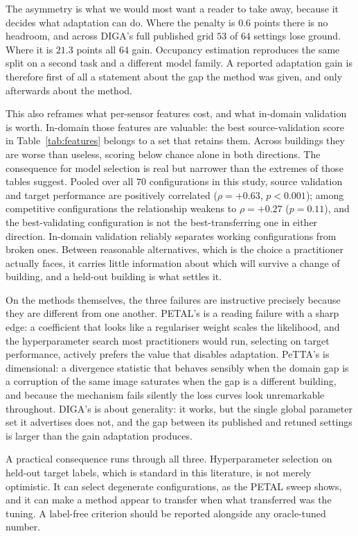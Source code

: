 \documentclass[a4paper,fleqn]{cas-dc}
\begin{document}
The asymmetry is what we would most want a reader to take away, because it decides what
adaptation can do. Where the penalty is $0.6$ points there is no headroom, and across
DIGA's full published grid $53$ of $64$ settings lose ground. Where it is $21.3$ points
all $64$ gain. Occupancy estimation reproduces the same split on a second task and a
different model family. A reported adaptation gain is therefore first of all a statement
about the gap the method was given, and only afterwards about the method.

This also reframes what per-sensor features cost, and what in-domain validation is worth.
In-domain those features are valuable: the best source-validation score in
Table~\ref{tab:features} belongs to a set that retains them. Across buildings they are
worse than useless, scoring below chance alone in both directions. The consequence for
model selection is real but narrower than the extremes of those tables suggest. Pooled
over all $70$ configurations in this study, source validation and target performance are
positively correlated ($\rho=+0.63$, $p<0.001$); among competitive configurations the
relationship weakens to $\rho=+0.27$ ($p=0.11$), and the best-validating configuration is
not the best-transferring one in either direction. In-domain validation reliably separates
working configurations from broken ones. Between reasonable alternatives, which is the
choice a practitioner actually faces, it carries little information about which will
survive a change of building, and a held-out building is what settles it.

On the methods themselves, the three failures are instructive precisely because they are
different from one another. PETAL's is a reading failure with a sharp edge: a coefficient
that looks like a regulariser weight scales the likelihood, and the hyperparameter search
most practitioners would run, selecting on target performance, actively prefers the
value that disables adaptation. PeTTA's is dimensional: a divergence statistic that behaves
sensibly when the domain gap is a corruption of the same image saturates when the gap is a
different building, and because the mechanism fails silently the loss curves look
unremarkable throughout. DIGA's is about generality: it works, but the single global
parameter set it advertises does not, and the gap between its published and retuned
settings is larger than the gain adaptation produces.

A practical consequence runs through all three. Hyperparameter selection on held-out target
labels, which is standard in this literature, is not merely optimistic. It can select degenerate configurations, as the PETAL sweep shows, and it can
make a method appear to transfer when what transferred was the tuning. A label-free
criterion should be reported alongside any oracle-tuned number.
\end{document}
